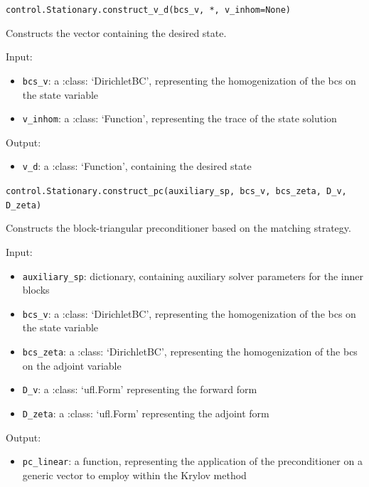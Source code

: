 \documentclass[letterpaper,10pt,english]{sphinxmanual}
\begin{document}
\vspace{3ex}

\texttt{control.Stationary.construct{\_}v{\_}d(bcs{\_}v, *, v{\_}inhom=None)}

Constructs the vector containing the desired state.

Input:
\begin{itemize}
\item \texttt{bcs{\_}v}: a :class: `DirichletBC', representing the homogenization
            of the bcs on the state variable

\item \texttt{v\_inhom}: a :class: `Function', representing the trace of the
            state solution
\end{itemize}

Output:
\begin{itemize}
\item \texttt{v{\_}d}: a :class: `Function', containing the desired state
\end{itemize}

\vspace{3ex}

\texttt{control.Stationary.construct{\_}pc(auxiliary{\_}sp, bcs{\_}v, bcs{\_}zeta, D{\_}v, D{\_}zeta)}

Constructs the block-triangular preconditioner based on the matching
        strategy.

Input:
\begin{itemize}
\item \texttt{auxiliary{\_}sp}: dictionary, containing auxiliary solver parameters
            for the inner blocks

\item \texttt{bcs{\_}v}: a :class: `DirichletBC', representing the homogenization
            of the bcs on the state variable

\item \texttt{bcs{\_}zeta}: a :class: `DirichletBC', representing the homogenization
            of the bcs on the adjoint variable

\item \texttt{D{\_}v}: a :class: `ufl.Form' representing the forward form

\item \texttt{D{\_}zeta}: a :class: `ufl.Form' representing the adjoint form

\end{itemize}

Output:
\begin{itemize}
\item \texttt{pc{\_}linear}: a function, representing the application of the
            preconditioner on a generic vector to employ within the Krylov
            method
\end{itemize}
\end{document}
